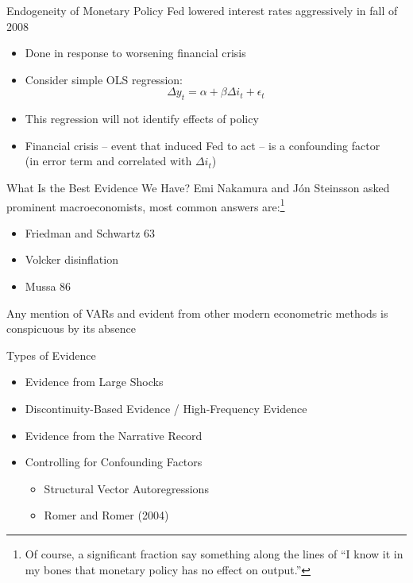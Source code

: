 \documentclass[11pt,aspectratio=169,xcolor={dvipsnames},hyperref={pdftex,pdfpagemode=UseNone,hidelinks,pdfdisplaydoctitle=true},usepdftitle=false]{beamer}
\begin{document}
\begin{frame}{Endogeneity of Monetary Policy}
Fed lowered interest rates aggressively in fall of 2008
\begin{itemize}
\item Done in response to worsening financial crisis \pause 
\item Consider simple OLS regression:
\[ \Delta y_{t} = \alpha + \beta \Delta i_{t} + \epsilon_{t} \] \pause \vspace{-15pt}
\item This regression will not identify effects of policy
\item Financial crisis -- event that induced Fed to act -- is a confounding factor \\ (in error term and correlated with $\Delta i_{t}$)
\end{itemize}
\end{frame}


\begin{frame}{What Is the Best Evidence We Have?}
Emi Nakamura and J\'on Steinsson asked prominent macroeconomists, most common answers are:\footnote{\baselineskip=11pt Of course, a significant fraction say something along the lines of ``I know it in my bones that monetary policy has no effect on output.''}
\begin{itemize}
\item Friedman and Schwartz 63
\item Volcker disinflation
\item Mussa 86
\end{itemize}
\bigskip
Any mention of VARs and evident from other modern econometric methods is conspicuous by its absence 
\end{frame}


\begin{frame}{Types of Evidence}
\begin{itemize}
\item Evidence from Large Shocks
\item Discontinuity-Based Evidence / High-Frequency Evidence
\item Evidence from the Narrative Record
\item Controlling for Confounding Factors
\begin{itemize}
\item Structural Vector Autoregressions
\item Romer and Romer (2004)
\end{itemize}
\end{itemize}
\end{frame}
\end{document}
